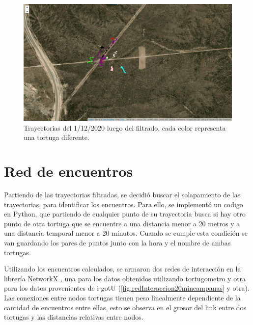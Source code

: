 \begin{figure}[ht]
    \begin{center}
       
   
    \includegraphics[width=\imsize]{Chap2/Traye1_12_conF.png}
\end{center}
    \caption[Trayectorias un dia de medición, despues del filtrado.]{Trayectorias del 1/12/2020 luego del filtrado, cada color representa una tortuga diferente.}
    \label{fig:trayeConFiltr}
\end{figure}

\section{Red de encuentros}
Partiendo de las trayectorias filtradas, se decidió buscar el solapamiento de las trayectorias, para identificar los encuentros. Para ello, se implementó un codigo en Python, que partiendo de cualquier punto de su trayectoria busca si hay otro punto de otra tortuga que se encuentre a una distancia menor a 20 metros y a una distancia temporal menor a 20 minutos. Cuando se cumple esta condición se van guardando los pares de puntos junto con la hora y el nombre de ambas tortugas. 

Utilizando los encuentros calculados, se armaron dos redes de interacción  en la librería NetworkX \cite{networkx}, una para los datos obtenidos utilizando  tortugometro y otra para los datos provenientes de i-gotU (\ref{fig:redInteraccion20mincampanas} y otra). Las conexiones entre nodos tortugas tienen peso linealmente dependiente de la cantidad de encuentros entre ellas, esto se observa en el grosor del link entre dos tortugas y las distancias relativas entre nodos.


